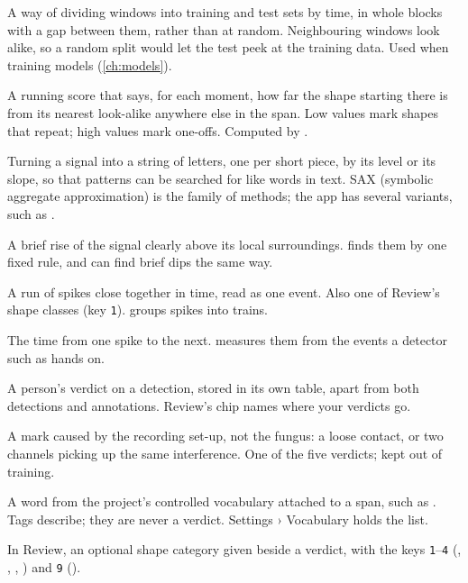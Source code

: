 \begin{glossarylist}
 A way of dividing windows into training and test
sets by time, in whole blocks with a gap between them, rather than at random. Neighbouring
windows look alike, so a random split would let the test peek at the training data. Used
when training models (\cref{ch:models}).

 A running score that says, for each moment, how
far the shape starting there is from its nearest look-alike anywhere else in the span. Low
values mark shapes that repeat; high values mark one-offs. Computed by
.

 Turning a signal into a string of letters,
one per short piece, by its level or its slope, so that patterns can be searched for like
words in text. SAX (symbolic aggregate approximation) is the family of methods; the app
has several variants, such as .

 A brief rise of the signal clearly above its local surroundings.
 finds them by one fixed rule, and can find brief dips the same
way.

 A run of spikes close together in time, read as one
event. Also one of Review's shape classes (key \texttt{1}). 
groups spikes into trains.

 The time from one spike to the next.
 measures them from the events a detector such as
 hands on.

 A person's verdict on a detection, stored in its own
table, apart from both detections and annotations. Review's  chip
names where your verdicts go.

 A mark caused by the recording set-up, not the fungus: a loose
contact, or two channels picking up the same interference. One of the five verdicts; kept
out of training.

 A word from the project's controlled vocabulary attached to a span,
such as . Tags describe; they are never a verdict. Settings › Vocabulary holds
the list.

 In Review, an optional shape category given beside a verdict, with
the keys \texttt{1}--\texttt{4} (, , ,
) and \texttt{9} ().


\end{glossarylist}
